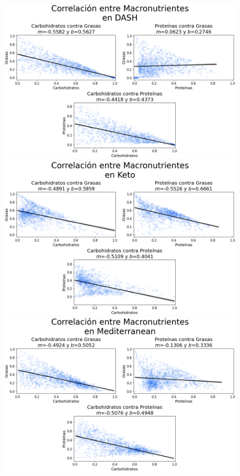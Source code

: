 \documentclass[12pt,a4paper]{article}
\begin{document}
{{            \begin{center}
                \includegraphics[width=0.9\textwidth]{Resources/Bivariado/RegressionDash.png}\\
                \includegraphics[width=0.9\textwidth]{Resources/Bivariado/RegressionKeto.png}\\
                \includegraphics[width=0.9\textwidth]{Resources/Bivariado/RegressionMediterranean.png}\\

\end{center}}}
\end{document}
